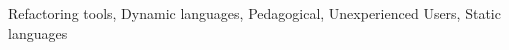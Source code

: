 
% 
% 

\begin{keywords}
Refactoring tools, Dynamic languages, Pedagogical, Unexperienced Users, Static languages
\end{keywords}